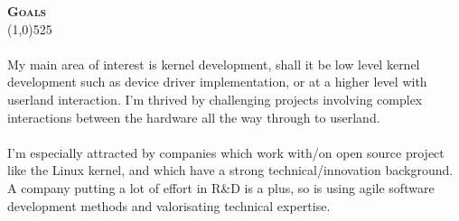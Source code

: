 \documentclass[letterpaper,11pt]{article}
\newcommand{\titlecolor}[0]{RoyalBlue4}
\newcommand{\resheading}[1]{
  \vspace{10pt}
  {\Large
        \textsc{\textcolor{\titlecolor}{\textbf{#1}}}
  } \\
  \vspace{-10.5pt}
  \hspace{-1pt}\textcolor{\titlecolor}{\line(1,0){525}}
}
\begin{document}
\vspace{8pt}
\resheading{Goals}
\begin{minipage}{0.95\linewidth}
\vspace{10pt}
\paragraph{}
My main area of interest is kernel development, shall it be low level kernel
development such as device driver implementation, or at a higher level with
userland interaction. I'm thrived by challenging projects involving
complex interactions between the hardware all the way through to userland.
\paragraph{}
I'm especially attracted by companies which work with/on open source project
like the Linux kernel, and which have a strong technical/innovation
background. A company putting a lot of effort in R\&D is a plus, so is 
using agile software development methods and valorisating technical
expertise.

\end{minipage}
\end{document}
